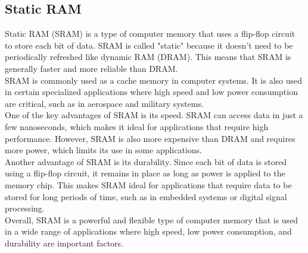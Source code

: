 \subsection{Static RAM}
Static RAM (SRAM) is a type of computer memory that uses a flip-flop circuit to store each bit of data. SRAM is called "static" because it doesn't need to be periodically refreshed like dynamic RAM (DRAM). This means that SRAM is generally faster and more reliable than DRAM.\\
SRAM is commonly used as a cache memory in computer systems. It is also used in certain specialized applications where high speed and low power consumption are critical, such as in aerospace and military systems.\\
One of the key advantages of SRAM is its speed. SRAM can access data in just a few nanoseconds, which makes it ideal for applications that require high performance. However, SRAM is also more expensive than DRAM and requires more power, which limits its use in some applications.\\
Another advantage of SRAM is its durability. Since each bit of data is stored using a flip-flop circuit, it remains in place as long as power is applied to the memory chip. This makes SRAM ideal for applications that require data to be stored for long periods of time, such as in embedded systems or digital signal processing.\\
Overall, SRAM is a powerful and flexible type of computer memory that is used in a wide range of applications where high speed, low power consumption, and durability are important factors.

